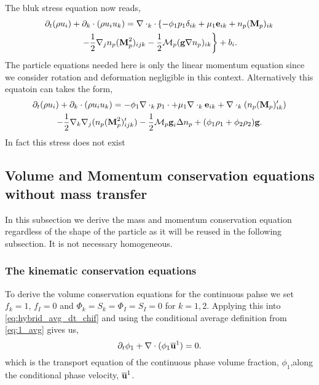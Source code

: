 The bluk stress equation now reads, 
\begin{multline}
    \partial_t (\rho u_i)
    + \partial_k \cdot (\rho u_i u_k)
    = 
    \mathbf{\nabla}\cdot_k\cdot
    \left\{
    - \phi_1 p_1 \delta_{ik} 
    + \mu_1 \textbf{e}_{ik}
    + n_p (\textbf{M}_p)_{ik}
    \right. \\ \left. 
    - \frac{1}{2}\nabla_j n_p (\textbf{M}_p^2)_{ijk}
    - \frac{1}{2}\mathcal{M}_p  (\textbf{g} \nabla n_p)_{ik}    
    \right\}
    + b_i. 
\end{multline}
The particle equations needed here is only the linear momentum equation since we consider rotation and deformation  negligible in this context. 
Alternatively this equatoin can takes the form, 
\begin{multline}
    \partial_t (\rho u_i)
    + \partial_k \cdot (\rho u_i u_k)
    = 
    - \phi_1 \mathbf{\nabla}\cdot_k p_1\cdot
    + \mu_1 \mathbf{\nabla}\cdot_k \textbf{e}_{ik}
    + \mathbf{\nabla}\cdot_k (n_p (\textbf{M}_p )'_{ik})\\
    - \frac{1}{2}\nabla_k\nabla_j (n_p (\textbf{M}_p^2)'_{ijk})
    - \frac{1}{2}\mathcal{M}_p  \textbf{g}_i \Delta n_p 
    + (\phi_1 \rho_1 + \phi_2 \rho_2 )\textbf{g}. 
\end{multline}
In fact this stress does not exist
\subsection{Volume and Momentum conservation equations without mass transfer}

In this subsection we derive the mass and momentum conservation equation regardless of the shape of the particle as it will be reused in the following subsection. 
It is not necessary homogeneous. 
\subsubsection{The kinematic conservation equations}

To derive the volume conservation equations for the continuous pahse we set $f_{k} = 1$, $f_I = 0$ and  $\Phi_{k} = S_{k} =\Phi_{I} = S_{I} = 0$ for $k=1,2$. 
Applying this into \ref{eq:hybrid_avg_dt_chif} and using the conditional average definition from \ref{eq:1_avg} gives us,
\begin{equation}
    \partial_t \phi_1
    + \mathbf{\nabla}\cdot (\phi_1 \overline{\textbf{u}}^1)
    = 0.
    \label{eq:hybrid_avg_dt_chi}
\end{equation}
which is the transport equation of the continuous phase volume fraction, $\phi_1$,along the conditional phase velocity, $\overline{\textbf{u}}^1$. 


